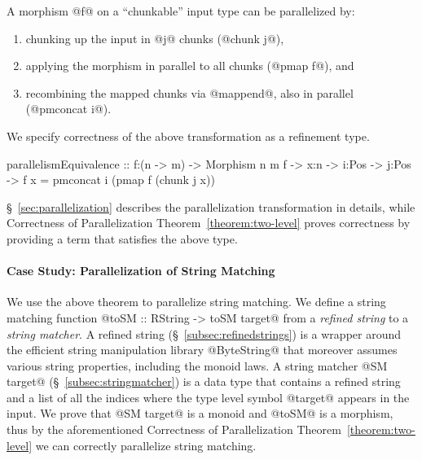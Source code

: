 A morphism @f@ on a ``chunkable'' input type can be parallelized by:
\begin{enumerate}
  \item chunking up the input in @j@ chunks (@chunk j@),
  \item applying the morphism in parallel to all chunks (@pmap f@), and
  \item recombining the mapped chunks via @mappend@, also in parallel (@pmconcat i@).
\end{enumerate}
%
We specify correctness of the above transformation as a refinement type.
%
\begin{code}
parallelismEquivalence
  :: f:(n -> m) -> Morphism n m f -> x:n -> i:Pos -> j:Pos
   -> {f x = pmconcat i (pmap f (chunk j x))}
\end{code}
%
\S~\ref{sec:parallelization} describes the parallelization transformation in details,
while Correctness of Parallelization Theorem~\ref{theorem:two-level} proves correctness
by providing a
term that satisfies the above type.

\paragraph{Case Study: Parallelization of String Matching}
We use the above theorem to parallelize string matching.
We define a string matching function @toSM :: RString -> toSM target@
from a \textit{refined string} to a \textit{string matcher}.
%
A refined string (\S~\ref{subsec:refinedstrings}) is a wrapper around
the efficient string manipulation library
@ByteString@ that moreover assumes
various string properties, including the monoid laws.
%
A string matcher @SM target@ (\S~\ref{subsec:stringmatcher}) is a data type that contains
a refined string and a list of all the indices
where the type level symbol @target@ appears in the input.
%
We prove that @SM target@ is a monoid and @toSM@ is a morphism,
thus by the aforementioned Correctness of Parallelization Theorem~\ref{theorem:two-level}
we can correctly parallelize string matching.




